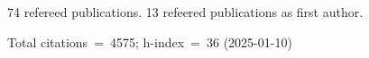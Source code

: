 74 refereed publications. 13 refeered publications as first author.

Total citations~=~4575; h-index~=~36 (2025-01-10)